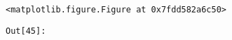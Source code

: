 \documentclass[11pt]{article}
\begin{document}
    
    \begin{verbatim}
<matplotlib.figure.Figure at 0x7fdd582a6c50>
    \end{verbatim}

    \texttt{\color{outcolor}Out[{\color{outcolor}45}]:}
    
    \begin{center}
    \end{center}
    { \hspace*{\fill} \\}
    


    
    
    
    
\end{document}
